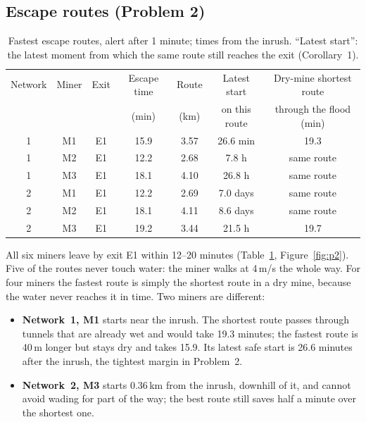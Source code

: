 \documentclass[11pt,a4paper]{article}
\theoremstyle{remark}
\begin{document}
\subsection{Escape routes (Problem 2)}

\begin{table}[htbp]
  \centering\small
  \begin{tabular}{@{}c c c c c c c@{}}
    \toprule
    Network & Miner & Exit & Escape time & Route & Latest start & Dry-mine shortest route\\
            &       &      & (min)       & (km)  & on this route & through the flood (min)\\
    \midrule
    1 & M1 & E1 & 15.9 & 3.57 & 26.6 min & 19.3\\
    1 & M2 & E1 & 12.2 & 2.68 & 7.8 h    & same route\\
    1 & M3 & E1 & 18.1 & 4.10 & 26.8 h   & same route\\
    2 & M1 & E1 & 12.2 & 2.69 & 7.0 days & same route\\
    2 & M2 & E1 & 18.1 & 4.11 & 8.6 days & same route\\
    2 & M3 & E1 & 19.2 & 3.44 & 21.5 h   & 19.7\\
    \bottomrule
  \end{tabular}
  \caption{Fastest escape routes, alert after 1 minute; times from the inrush. ``Latest start'': the latest moment from which the same route still reaches the exit (Corollary~1).}
  \label{tab:p2}
\end{table}

All six miners leave by exit E1 within 12--20 minutes (Table~\ref{tab:p2}, Figure~\ref{fig:p2}). Five of the routes never touch water: the miner walks at 4\,m/s the whole way. For four miners the fastest route is simply the shortest route in a dry mine, because the water never reaches it in time. Two miners are different:
\begin{itemize}[leftmargin=1.5em, itemsep=2pt, topsep=2pt]
  \item \textbf{Network~1, M1} starts near the inrush. The shortest route passes through tunnels that are already wet and would take 19.3 minutes; the fastest route is 40\,m longer but stays dry and takes 15.9. Its latest safe start is 26.6 minutes after the inrush, the tightest margin in Problem~2.
  \item \textbf{Network~2, M3} starts 0.36\,km from the inrush, downhill of it, and cannot avoid wading for part of the way; the best route still saves half a minute over the shortest one.
\end{itemize}
\end{document}
